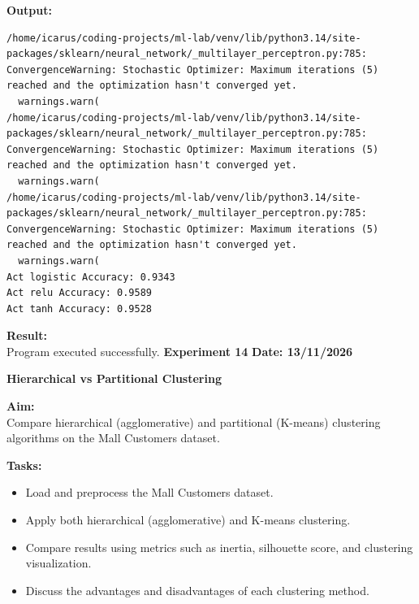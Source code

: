 \documentclass[12pt, a4paper]{article}
\begin{document}
\vspace{\baselineskip}
\newpage
\noindent \textbf{Output:}\\
\begin{lstlisting}[style=terminal]
/home/icarus/coding-projects/ml-lab/venv/lib/python3.14/site-packages/sklearn/neural_network/_multilayer_perceptron.py:785: ConvergenceWarning: Stochastic Optimizer: Maximum iterations (5) reached and the optimization hasn't converged yet.
  warnings.warn(
/home/icarus/coding-projects/ml-lab/venv/lib/python3.14/site-packages/sklearn/neural_network/_multilayer_perceptron.py:785: ConvergenceWarning: Stochastic Optimizer: Maximum iterations (5) reached and the optimization hasn't converged yet.
  warnings.warn(
/home/icarus/coding-projects/ml-lab/venv/lib/python3.14/site-packages/sklearn/neural_network/_multilayer_perceptron.py:785: ConvergenceWarning: Stochastic Optimizer: Maximum iterations (5) reached and the optimization hasn't converged yet.
  warnings.warn(
Act logistic Accuracy: 0.9343
Act relu Accuracy: 0.9589
Act tanh Accuracy: 0.9528
\end{lstlisting}

\vspace{\baselineskip}

\noindent \textbf{Result:}\\
Program executed successfully.
\newpage
\noindent \textbf{Experiment 14} \hfill \textbf{Date: 13/11/2026}\\
\begin{center} \Large \textbf{Hierarchical vs Partitional Clustering} \end{center}
\textbf{Aim:}\\
Compare hierarchical (agglomerative) and partitional (K-means) clustering algorithms on the Mall Customers dataset.

\vspace{\baselineskip}
\noindent \textbf{Tasks:}\\
\vspace{-0.5\baselineskip}
\begin{itemize}[nosep]
    \item Load and preprocess the Mall Customers dataset.
    \item Apply both hierarchical (agglomerative) and K-means clustering.
    \item Compare results using metrics such as inertia, silhouette score, and clustering visualization.
    \item Discuss the advantages and disadvantages of each clustering method.
\end{itemize}
\end{document}
